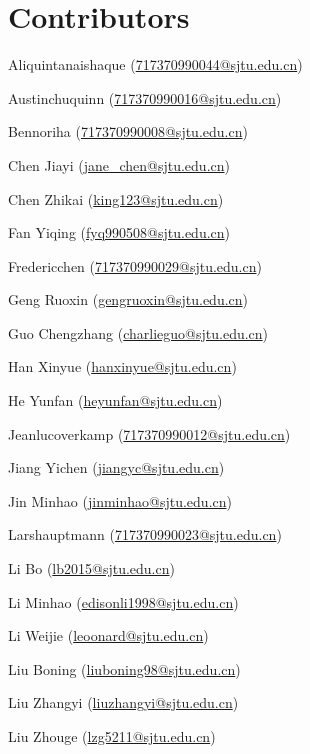 \section*{Contributors}

Aliquintanaishaque (\href{mailto:717370990044@sjtu.edu.cn}{717370990044@sjtu.edu.cn})

Austinchuquinn (\href{mailto:717370990016@sjtu.edu.cn}{717370990016@sjtu.edu.cn})

Bennoriha (\href{mailto:717370990008@sjtu.edu.cn}{717370990008@sjtu.edu.cn})

Chen Jiayi (\href{mailto:jane_chen@sjtu.edu.cn}{jane\_chen@sjtu.edu.cn})

Chen Zhikai (\href{mailto:king123@sjtu.edu.cn}{king123@sjtu.edu.cn})

Fan Yiqing (\href{mailto:fyq990508@sjtu.edu.cn}{fyq990508@sjtu.edu.cn})

Fredericchen (\href{mailto:717370990029@sjtu.edu.cn}{717370990029@sjtu.edu.cn})

Geng Ruoxin (\href{mailto:gengruoxin@sjtu.edu.cn}{gengruoxin@sjtu.edu.cn})

Guo Chengzhang (\href{mailto:charlieguo@sjtu.edu.cn}{charlieguo@sjtu.edu.cn})

Han Xinyue (\href{mailto:hanxinyue@sjtu.edu.cn}{hanxinyue@sjtu.edu.cn})

He Yunfan (\href{mailto:heyunfan@sjtu.edu.cn}{heyunfan@sjtu.edu.cn})

Jeanlucoverkamp (\href{mailto:717370990012@sjtu.edu.cn}{717370990012@sjtu.edu.cn})

Jiang Yichen (\href{mailto:jiangyc@sjtu.edu.cn}{jiangyc@sjtu.edu.cn})

Jin Minhao (\href{mailto:jinminhao@sjtu.edu.cn}{jinminhao@sjtu.edu.cn})

Larshauptmann (\href{mailto:717370990023@sjtu.edu.cn}{717370990023@sjtu.edu.cn})

Li Bo (\href{mailto:lb2015@sjtu.edu.cn}{lb2015@sjtu.edu.cn})

Li Minhao (\href{mailto:edisonli1998@sjtu.edu.cn}{edisonli1998@sjtu.edu.cn})

Li Weijie (\href{mailto:leoonard@sjtu.edu.cn}{leoonard@sjtu.edu.cn})

Liu Boning (\href{mailto:liuboning98@sjtu.edu.cn}{liuboning98@sjtu.edu.cn})

Liu Zhangyi (\href{mailto:liuzhangyi@sjtu.edu.cn}{liuzhangyi@sjtu.edu.cn})

Liu Zhouge (\href{mailto:lzg5211@sjtu.edu.cn}{lzg5211@sjtu.edu.cn})

